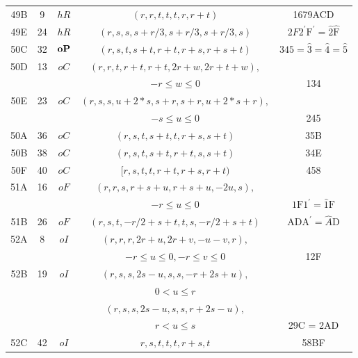 \documentclass[preprint]{iucr}              %
\begin{document}
{\begin{table}
\begin{center}
\begin{tabular}{|c|c|c|c|c|}
49B&9&$hR$&$(r,r,t,t,t,r,r+t)$&1679ACD\\
49E&24&$hR$&$(r,s,s,s+r/3,s+r/3,s+r/3,s)$&$2F2^\prime \text{F}^\prime = \hat{2}\hat{\text{F}}$\\
\hline
50C&32&${\bf oP}$&$(r,s,t,s+t,r+t,r+s,r+s+t)$&$345 = \hat{3} = \hat{4} = \hat{5}$\\
\hline
50D&13&$oC$&$(r,r,t,r+t,r+t,2r+w,2r+t+w),$&\\
&&&$-r \leq w \leq 0$&134\\
50E&23&$oC$&$(r,s,s,u+2*s,s+r,s+r,u+2*s+r),$&\\
&&&$-s \leq u \leq 0$&245\\
50A&36&$oC$&$(r,s,t,s+t,t,r+s,s+t)$&35B\\
50B&38&$oC$&$(r,s,t,s+t,r+t,s,s+t)$&34E\\
50F&40&$oC$&$[r,s,t,t,r+t,r+s,r+t)$&458\\
\hline
51A&16&$oF$&$(r,r,s,r+s+u,r+s+u,-2u,s),$&\\
&&&$-r \leq u \leq 0$&$\text{1F1}^{\prime} = \hat{1}\text{F}$\\
51B&26&$oF$&$(r,s,t,-r/2+s+t,t,s,-r/2+s+t)$&$\text{ADA}^{\prime}  = \hat{A}\text{D}$\\
\hline
52A&8&$oI$&$(r,r,r,2r+u,2r+v,-u-v,r),$&\\
&&&$-r \leq u \leq 0, -r \leq v \leq 0$&12F\\
52B&19&$oI$&$ (r,s,s,2s-u,s,s,-r+2s+u),$&\\
&&&$0 < u \leq r $&\\
&&&$ (r,s,s,2s-u,s,s,r+2s-u),$&\\
&&&$r < u \leq s $&29C = 2AD\\
52C&42&$oI$&$r,s,t,t,t,r+s,t$&58BF\\
\hline
\end{tabular}
\end{center}
\label{NiggliFormsI}
\end{table}%

}
\end{document}
